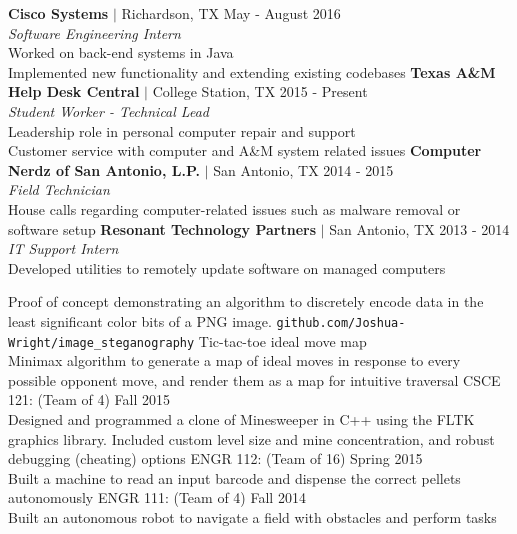 \documentclass[12pt]{article}
\begin{document}
\begin{flushleft}
\begin{outline}[compactitem]
  \1 \textbf{Cisco Systems} $|$ Richardson, TX \hfill May - August 2016
  \\ \textit{Software Engineering Intern}
  \\ Worked on back-end systems in Java
  \\ Implemented new functionality and extending existing codebases
  \1 \textbf{Texas A\&M Help Desk Central} $|$ College Station, TX \hfill 2015 - Present
    \\ \textit{Student Worker - Technical Lead}
    \\ Leadership role in personal computer repair and support
    \\ Customer service with  computer and A\&M system related issues
  \1 \textbf{Computer Nerdz of San Antonio, L.P.} $|$ San Antonio, TX \hfill 2014 - 2015
    \\ \textit{Field Technician}
    \\ House calls regarding computer-related issues such as malware removal or software setup
  \1 \textbf{Resonant Technology Partners} $|$ San Antonio, TX \hfill 2013 - 2014
    \\ \textit{IT Support Intern}
    \\ Developed utilities to remotely update software on managed computers

  \1 Proof of concept demonstrating an algorithm to discretely encode data in the least significant color bits of a PNG image.
    \verb|github.com/Joshua-Wright/image_steganography|
  \1 Tic-tac-toe ideal move map
    \\ Minimax algorithm to generate a map of ideal moves in response to every possible opponent move, and render them as a map for intuitive traversal
  \1 CSCE 121:  (Team of 4) \hfill Fall 2015 
    \\ Designed and programmed a clone of Minesweeper in C++ using the FLTK graphics library. Included custom level size and mine concentration, and robust debugging (cheating) options
  \1 ENGR 112: (Team of 16) \hfill Spring 2015
    \\ Built a machine to read an input barcode and dispense the correct pellets autonomously 
  \1 ENGR 111: (Team of 4) \hfill Fall 2014
    \\ Built an autonomous robot to navigate a field with obstacles and perform tasks


\end{outline}
\end{flushleft}
\end{document}
